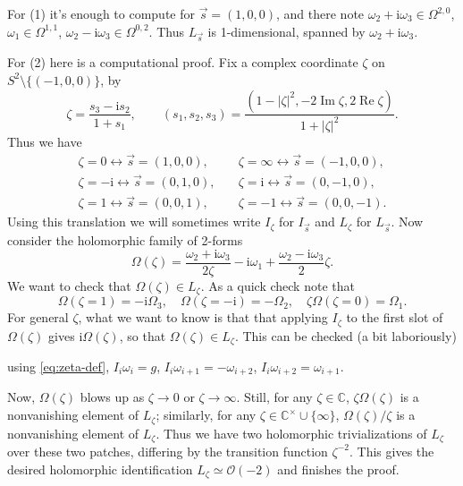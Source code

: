 \documentclass[12pt,letterpaper,reqno]{article}
\numberwithin{equation}{section}
\newcommand{\cO}{\ensuremath{\mathcal O}}
\newcommand{\C}{\ensuremath{\mathbb C}}
\newcommand{\I}{{\mathrm i}}
\newcommand{\abs}[1]{\lvert#1\rvert}
\newcommand{\mmaref}[1]{}
\DeclareMathOperator{\im}{Im}
\DeclareMathOperator{\re}{Re}
\begin{document}
\begin{pf}
For (1) it's enough to compute for $\vec{s} = (1,0,0)$, and there note
$\omega_2 + \I \omega_3 \in \Omega^{2,0}$, $\omega_1 \in \Omega^{1,1}$,
$\omega_2 - \I \omega_3 \in \Omega^{0,2}$. Thus $L_{\vec s}$ is 1-dimensional,
spanned by $\omega_2 + \I \omega_3$.

For (2) here is a computational proof.
Fix a complex coordinate $\zeta$
on $S^2 \setminus \{ (-1,0,0) \}$, by
\begin{equation} \label{eq:zeta-def}
 \zeta = \frac{s_3 - \I s_2}{1 + s_1}, \qquad (s_1, s_2, s_3) = \frac{(1 - \abs{\zeta}^2, -2 \im \zeta, 2 \re \zeta)}{1+\abs{\zeta}^2}.
\end{equation}
Thus we have
\begin{align}
  \zeta = 0 \leftrightarrow \vec s = (1,0,0), \quad & \zeta = \infty \leftrightarrow \vec s = (-1,0,0), \\
  \zeta = -\I \leftrightarrow \vec s = (0,1,0), \quad & \zeta = \I \leftrightarrow \vec s = (0,-1,0), \\
  \zeta = 1 \leftrightarrow \vec s = (0,0,1), \quad & \zeta = -1 \leftrightarrow \vec s = (0,0,-1).
\end{align}
Using this translation we will sometimes write
$I_\zeta$ for $I_{\vec s}$ and $L_\zeta$ for $L_{\vec s}$.
Now consider the holomorphic family of 2-forms
\begin{equation} \label{eq:hol-symp-family}
  \Omega(\zeta) = \frac{\omega_2 + \I \omega_3}{2\zeta} - \I\omega_1 + \frac{\omega_2 - \I \omega_3}{2} \zeta.
\end{equation}
We want to check that $\Omega(\zeta) \in L_\zeta$.
As a quick check note that
\begin{equation}
  \Omega(\zeta=1) = -\I \Omega_3, \quad \Omega(\zeta=-\I) = - \Omega_2, \quad \zeta \Omega(\zeta=0) = \Omega_1.
\end{equation}
For general $\zeta$, what we want to know is that
that applying $I_\zeta$ to the first slot of $\Omega(\zeta)$ gives
$\I \Omega(\zeta)$, so that $\Omega(\zeta) \in L_\zeta$.
This can be checked (a bit laboriously)
\mmaref{verify-holsymp}
using \eqref{eq:zeta-def}, $I_i \omega_i = g$,
$I_i \omega_{i+1} = -\omega_{i+2}$, $I_i \omega_{i+2} = \omega_{i+1}$.

Now, $\Omega(\zeta)$ blows up as $\zeta \to 0$ or
$\zeta \to \infty.$
Still, for any $\zeta \in \C$, $\zeta \Omega(\zeta)$ is
a nonvanishing element of $L_\zeta$;
similarly, for any $\zeta \in \C^\times \cup \{\infty\}$,
$\Omega(\zeta) / \zeta$ is a nonvanishing element of $L_\zeta$.
Thus we have two holomorphic trivializations of $L_\zeta$ over
these two patches, differing by the transition function $\zeta^{-2}$.
This gives the desired holomorphic identification
$L_\zeta \simeq \cO(-2)$ and finishes the proof.
\end{pf}
\end{document}

